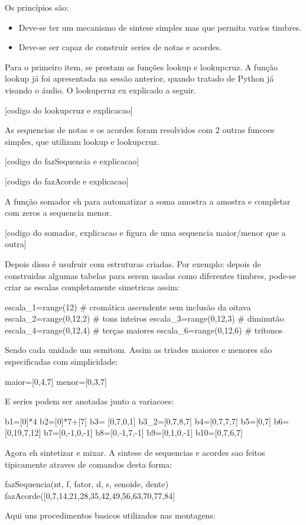 Os princípios são:
\begin{itemize}
  \item Deve-se ter um mecanismo de sintese simples mas que
permita varios timbres.
  \item Deve-se ser capaz de construir series de notas e acordes.
\end{itemize}

Para o primeiro item, se prestam as funções lookup e lookupcruz. A função
lookup já foi apresentada na sessão anterior, quando tratado de Python já visando o áudio.
O lookupcruz ex explicado a seguir.

[codigo do lookupcruz e explicacao]

As sequencias de notas e os acordes foram resolvidos com 2 outras funcoes simples,
que utilizam lookup e lookupcruz.

[codigo do fazSequencia e explicacao]

[codigo do fazAcorde e explicacao]

A função somador eh para automatizar a soma amostra a amostra e completar com zeros a
sequencia menor.

[codigo do somador, explicacao e figura de uma sequencia maior/menor que a outra]

Depois disso é usufruir com estruturas criadas. Por exemplo: depois de construidas
algumas tabelas para serem usadas como diferentes timbres, pode-se criar as
escalas completamente simetricas assim:

escala\_1=range(12) # cromática ascendente sem inclusão da oitava
escala\_2=range(0,12,2) # tons inteiros
escala\_3=range(0,12,3) # diminutão
escala\_4=range(0,12,4) # terças maiores
escala\_6=range(0,12,6) # trítonos

Sendo cada unidade um semitom. Assim as triades maiores e menores
são especificadas com simplicidade:

maior=[0,4,7]
menor=[0,3,7]

E series podem ser anotadas junto a variacoes:

b1=[0]*4
b2=[0]*7+[7]
b3=  [0,7,0,1]
b3\_2=[0,7,8,7]
b4=[0,7,7,7]
b5=[0,7]
b6=[0,19,7,12]
b7=[0,-1,0,-1]
b8=[0,-1,7,-1]
b9=[0,1,0,-1]
b10=[0,7,6,7]

Agora eh sintetizar e mixar. A sintese de sequencias e acordes sao feitos tipicamente
atraves de comandos desta forma:

fazSequencia(nt, f, fator, d, s, senoide, dente)
fazAcorde([0,7,14,21,28,35,42,49,56,63,70,77,84]

Aqui uns procedimentos basicos utilizados nas montagens:

